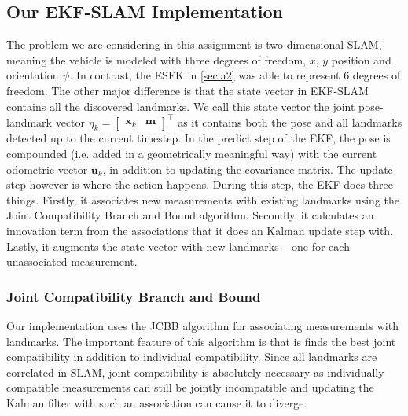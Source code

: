 \subsection{Our EKF-SLAM Implementation}
The problem we are considering in this assignment is two-dimensional SLAM, meaning the vehicle is modeled with three degrees of freedom, $x$, $y$ position and orientation $\psi$. In contrast, the ESFK in \ref{sec:a2} was able to represent 6 degrees of freedom. The other major difference is that the state vector in EKF-SLAM contains all the discovered landmarks. We call this state vector the joint pose-landmark vector $\eta_k = \begin{bmatrix} \mathbf{x}_k & \mathbf{m} \end{bmatrix}^{\top}$ as it contains both the pose and all landmarks detected up to the current timestep. In the predict step of the EKF, the pose is compounded (i.e. added in a geometrically meaningful way) with the current odometric vector $\mathbf{u}_k$, in addition to updating the covariance matrix. The update step however is where the action happens. During this step, the EKF does three things. Firstly, it associates new measurements with existing landmarks using the Joint Compatibility Branch and Bound algorithm. Secondly, it calculates an innovation term from the associations that it does an Kalman update step with. Lastly, it augments the state vector with new landmarks – one for each unassociated measurement.

\subsubsection{Joint Compatibility Branch and Bound}
Our implementation uses the JCBB algorithm for associating measurements with landmarks. The important feature of this algorithm is that is finds the best joint compatibility in addition to individual compatibility. Since all landmarks are correlated in SLAM, joint compatibility is absolutely necessary as individually compatible measurements can still be jointly incompatible and updating the Kalman filter with such an association can cause it to diverge.\cite{jcbb}






